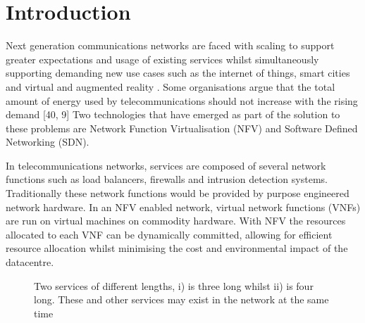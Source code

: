
\section{Introduction}
\label{sec:introduction}
Next generation communications networks are faced with scaling to support greater expectations and usage of existing services \cite{AndrewsBCHLSZ14} whilst simultaneously supporting demanding new use cases such as the internet of things, smart cities and virtual and augmented reality \cite{GSA15}. Some organisations argue that the total amount of energy used by telecommunications should
not increase with the rising demand [40, 9] Two technologies that have emerged as part of the solution to these problems are Network Function Virtualisation (NFV) and Software Defined Networking (SDN).

In telecommunications networks, services are composed of several network functions such as load balancers, firewalls and intrusion detection systems. Traditionally these network functions would be provided by purpose engineered network hardware. In an NFV enabled network, virtual network functions (VNFs) are run on virtual machines on commodity hardware. With NFV the resources allocated to each VNF can be dynamically committed, allowing for efficient resource allocation whilst minimising the cost and environmental impact of the datacentre.

\begin{figure}

\centering


\caption{Two services of different lengths, i) is three long whilst ii) is four long. These and other services may exist in the network at the same time}
\label{fig:dag_nfv}

\end{figure}

